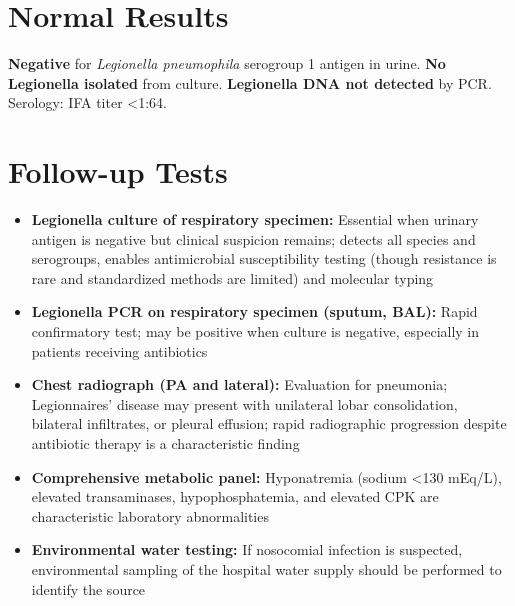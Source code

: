 \section*{Normal Results}
\textbf{Negative} for \textit{Legionella pneumophila} serogroup 1 antigen in urine. \textbf{No Legionella isolated} from culture. \textbf{Legionella DNA not detected} by PCR. Serology: IFA titer <1:64.

\section*{Follow-up Tests}
\begin{itemize}
  \item \textbf{Legionella culture of respiratory specimen:} Essential when urinary antigen is negative but clinical suspicion remains; detects all species and serogroups, enables antimicrobial susceptibility testing (though resistance is rare and standardized methods are limited) and molecular typing
  \item \textbf{Legionella PCR on respiratory specimen (sputum, BAL):} Rapid confirmatory test; may be positive when culture is negative, especially in patients receiving antibiotics
  \item \textbf{Chest radiograph (PA and lateral):} Evaluation for pneumonia; Legionnaires' disease may present with unilateral lobar consolidation, bilateral infiltrates, or pleural effusion; rapid radiographic progression despite antibiotic therapy is a characteristic finding
  \item \textbf{Comprehensive metabolic panel:} Hyponatremia (sodium <130 mEq/L), elevated transaminases, hypophosphatemia, and elevated CPK are characteristic laboratory abnormalities
  \item \textbf{Environmental water testing:} If nosocomial infection is suspected, environmental sampling of the hospital water supply should be performed to identify the source
\end{itemize}

